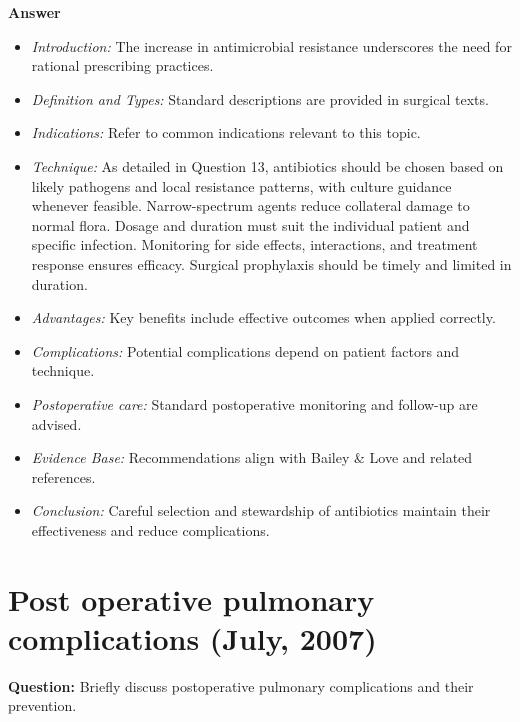 \documentclass{article}
\begin{document}
\textbf{Answer}
\begin{itemize}

\item \emph{Introduction:} The increase in antimicrobial resistance underscores the need for rational prescribing practices.
\item \emph{Definition and Types:} Standard descriptions are provided in surgical texts.
\item \emph{Indications:} Refer to common indications relevant to this topic.

\item \emph{Technique:} As detailed in Question 13, antibiotics should be chosen based on likely pathogens and local resistance patterns, with culture guidance whenever feasible. Narrow-spectrum agents reduce collateral damage to normal flora. Dosage and duration must suit the individual patient and specific infection. Monitoring for side effects, interactions, and treatment response ensures efficacy. Surgical prophylaxis should be timely and limited in duration.
\item \emph{Advantages:} Key benefits include effective outcomes when applied correctly.
\item \emph{Complications:} Potential complications depend on patient factors and technique.
\item \emph{Postoperative care:} Standard postoperative monitoring and follow-up are advised.
\item \emph{Evidence Base:} Recommendations align with Bailey \& Love and related references.

\item \emph{Conclusion:} Careful selection and stewardship of antibiotics maintain their effectiveness and reduce complications.


\end{itemize}

\section{Post operative pulmonary complications (July, 2007)}

\textbf{Question:} Briefly discuss postoperative pulmonary complications and their prevention.
\end{document}
